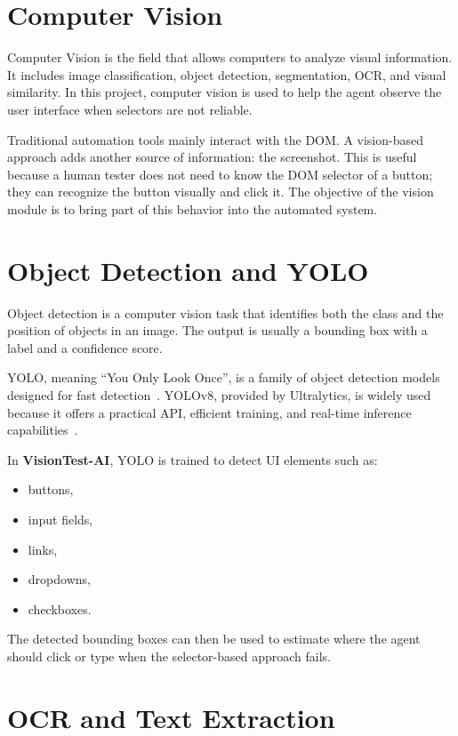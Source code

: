 \section{Computer Vision}
\label{sec:computer_vision_review}

Computer Vision is the field that allows computers to analyze visual information. It includes image classification, object detection, segmentation, OCR, and visual similarity. In this project, computer vision is used to help the agent observe the user interface when selectors are not reliable.

Traditional automation tools mainly interact with the DOM. A vision-based approach adds another source of information: the screenshot. This is useful because a human tester does not need to know the DOM selector of a button; they can recognize the button visually and click it. The objective of the vision module is to bring part of this behavior into the automated system.

\section{Object Detection and YOLO}
\label{sec:yolo_review}

Object detection is a computer vision task that identifies both the class and the position of objects in an image. The output is usually a bounding box with a label and a confidence score.

YOLO, meaning ``You Only Look Once'', is a family of object detection models designed for fast detection~\cite{yolo_original}. YOLOv8, provided by Ultralytics, is widely used because it offers a practical API, efficient training, and real-time inference capabilities~\cite{ultralytics_yolov8_docs}.

In \textbf{VisionTest-AI}, YOLO is trained to detect UI elements such as:

\begin{itemize}
	\item buttons,
	\item input fields,
	\item links,
	\item dropdowns,
	\item checkboxes.
\end{itemize}

The detected bounding boxes can then be used to estimate where the agent should click or type when the selector-based approach fails.

\section{OCR and Text Extraction}
\label{sec:ocr_review}

